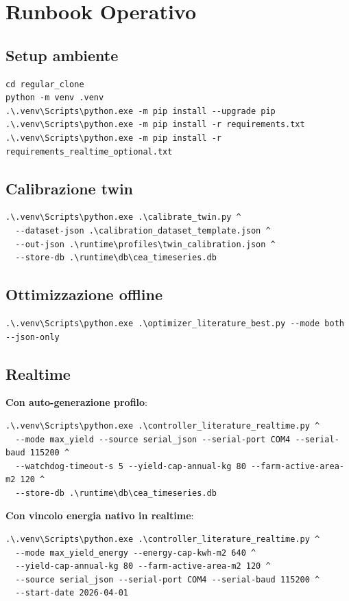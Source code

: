 ﻿\documentclass[11pt,a4paper]{report}
\begin{document}
\newpage
\chapter{Runbook Operativo}

\section{Setup ambiente}
\begin{lstlisting}
cd regular_clone
python -m venv .venv
.\.venv\Scripts\python.exe -m pip install --upgrade pip
.\.venv\Scripts\python.exe -m pip install -r requirements.txt
.\.venv\Scripts\python.exe -m pip install -r requirements_realtime_optional.txt
\end{lstlisting}

\section{Calibrazione twin}
\begin{lstlisting}
.\.venv\Scripts\python.exe .\calibrate_twin.py ^
  --dataset-json .\calibration_dataset_template.json ^
  --out-json .\runtime\profiles\twin_calibration.json ^
  --store-db .\runtime\db\cea_timeseries.db
\end{lstlisting}

\section{Ottimizzazione offline}
\begin{lstlisting}
.\.venv\Scripts\python.exe .\optimizer_literature_best.py --mode both --json-only
\end{lstlisting}

\section{Realtime}
\textbf{Con auto-generazione profilo}:
\begin{lstlisting}
.\.venv\Scripts\python.exe .\controller_literature_realtime.py ^
  --mode max_yield --source serial_json --serial-port COM4 --serial-baud 115200 ^
  --watchdog-timeout-s 5 --yield-cap-annual-kg 80 --farm-active-area-m2 120 ^
  --store-db .\runtime\db\cea_timeseries.db
\end{lstlisting}

\textbf{Con vincolo energia nativo in realtime}:
\begin{lstlisting}
.\.venv\Scripts\python.exe .\controller_literature_realtime.py ^
  --mode max_yield_energy --energy-cap-kwh-m2 640 ^
  --yield-cap-annual-kg 80 --farm-active-area-m2 120 ^
  --source serial_json --serial-port COM4 --serial-baud 115200 ^
  --start-date 2026-04-01
\end{lstlisting}
\end{document}
